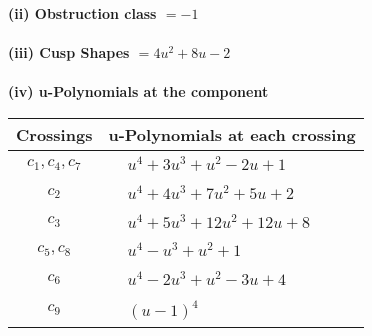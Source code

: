 \documentclass[1p]{elsarticle_modified}
\theoremstyle{definition}
\begin{document}
\flushleft \textbf{(ii) Obstruction class $= -1$}\\~\\
\flushleft \textbf{(iii) Cusp Shapes $= 4 u^2+8 u-2$}\\~\\
\newpage\renewcommand{\arraystretch}{1}
\flushleft \textbf{(iv) u-Polynomials at the component}\newline \\
\begin{tabular}{m{50pt}|m{274pt}}
Crossings & \hspace{64pt}u-Polynomials at each crossing \\
\hline $$\begin{aligned}c_{1},c_{4},c_{7}\end{aligned}$$&$\begin{aligned}
&u^4+3 u^3+u^2-2 u+1
\end{aligned}$\\
\hline $$\begin{aligned}c_{2}\end{aligned}$$&$\begin{aligned}
&u^4+4 u^3+7 u^2+5 u+2
\end{aligned}$\\
\hline $$\begin{aligned}c_{3}\end{aligned}$$&$\begin{aligned}
&u^4+5 u^3+12 u^2+12 u+8
\end{aligned}$\\
\hline $$\begin{aligned}c_{5},c_{8}\end{aligned}$$&$\begin{aligned}
&u^4- u^3+u^2+1
\end{aligned}$\\
\hline $$\begin{aligned}c_{6}\end{aligned}$$&$\begin{aligned}
&u^4-2 u^3+u^2-3 u+4
\end{aligned}$\\
\hline $$\begin{aligned}c_{9}\end{aligned}$$&$\begin{aligned}
&(u-1)^4
\end{aligned}$\\
\hline
\end{tabular}\\~\\
\end{document}
